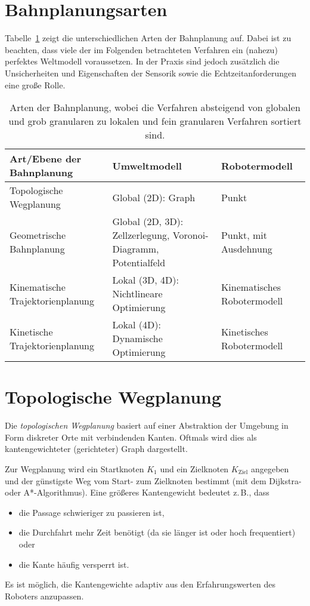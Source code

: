 	\section{Bahnplanungsarten}
		Tabelle~\ref{tab:pathplanningtypes} zeigt die unterschiedlichen Arten der Bahnplanung auf. Dabei ist zu beachten, dass viele der im Folgenden betrachteten Verfahren ein (nahezu) perfektes Weltmodell voraussetzen. In der Praxis sind jedoch zusätzlich die Unsicherheiten und Eigenschaften der Sensorik sowie die Echtzeitanforderungen eine große Rolle.

		\begin{table}
			\centering
			\begin{tabular}{l|p{6cm}|p{4cm}}
				\textbf{Art/Ebene der Bahnplanung} & \textbf{Umweltmodell}                                           & \textbf{Robotermodell}      \\ \hline
				Topologische Wegplanung            & Global (2D): Graph                                              & Punkt                       \\ \hline
				Geometrische Bahnplanung           & Global (2D, 3D): Zellzerlegung, Voronoi-Diagramm, Potentialfeld & Punkt, \ggf mit Ausdehnung  \\ \hline
				Kinematische Trajektorienplanung   & Lokal (3D, 4D): \newline Nichtlineare Optimierung               & Kinematisches Robotermodell \\ \hline
				Kinetische Trajektorienplanung     & Lokal (4D): \newline Dynamische Optimierung                     & Kinetisches Robotermodell
			\end{tabular}
			\caption{Arten der Bahnplanung, wobei die Verfahren absteigend von globalen und grob granularen zu lokalen und fein granularen Verfahren sortiert sind.}
			\label{tab:pathplanningtypes}
		\end{table}

	\section{Topologische Wegplanung}
		Die \emph{topologischen Wegplanung} basiert auf einer Abstraktion der Umgebung in Form diskreter Orte mit verbindenden Kanten. Oftmals wird dies als kantengewichteter (\ggf gerichteter) Graph dargestellt.

		Zur Wegplanung wird ein Startknoten \(K_1\) und ein Zielknoten \(K_\text{Ziel}\) angegeben und der günstigste Weg vom Start- zum Zielknoten bestimmt (\zB mit dem Dijkstra- oder A*-Algorithmus). Eine größeres Kantengewicht bedeutet z.\,B., dass
		\begin{itemize}
			\item die Passage schwieriger zu passieren ist,
			\item die Durchfahrt mehr Zeit benötigt (\zB da sie länger ist oder hoch frequentiert) oder
			\item die Kante häufig versperrt ist.
		\end{itemize}
		Es ist möglich, die Kantengewichte adaptiv aus den Erfahrungswerten des Roboters anzupassen.

